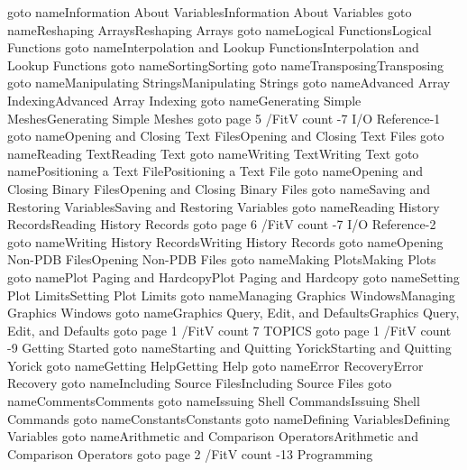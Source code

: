     \pdfoutline goto name{Information About Variables}{Information About Variables}
    \pdfoutline goto name{Reshaping Arrays}{Reshaping Arrays}
    \pdfoutline goto name{Logical Functions}{Logical Functions}
    \pdfoutline goto name{Interpolation and Lookup Functions}{Interpolation and Lookup Functions}
    \pdfoutline goto name{Sorting}{Sorting}
    \pdfoutline goto name{Transposing}{Transposing}
    \pdfoutline goto name{Manipulating Strings}{Manipulating Strings}
    \pdfoutline goto name{Advanced Array Indexing}{Advanced Array Indexing}
    \pdfoutline goto name{Generating Simple Meshes}{Generating Simple Meshes}
  \pdfoutline goto page 5 {/FitV} count -7 {I/O Reference-1}
    \pdfoutline goto name{Opening and Closing Text Files}{Opening and Closing Text Files}
    \pdfoutline goto name{Reading Text}{Reading Text}
    \pdfoutline goto name{Writing Text}{Writing Text}
    \pdfoutline goto name{Positioning a Text File}{Positioning a Text File}
    \pdfoutline goto name{Opening and Closing Binary Files}{Opening and Closing Binary Files}
    \pdfoutline goto name{Saving and Restoring Variables}{Saving and Restoring Variables}
    \pdfoutline goto name{Reading History Records}{Reading History Records}
  \pdfoutline goto page 6 {/FitV} count -7 {I/O Reference-2}
    \pdfoutline goto name{Writing History Records}{Writing History Records}
    \pdfoutline goto name{Opening Non-PDB Files}{Opening Non-PDB Files}
    \pdfoutline goto name{Making Plots}{Making Plots}
    \pdfoutline goto name{Plot Paging and Hardcopy}{Plot Paging and Hardcopy}
    \pdfoutline goto name{Setting Plot Limits}{Setting Plot Limits}
    \pdfoutline goto name{Managing Graphics Windows}{Managing Graphics Windows}
    \pdfoutline goto name{Graphics Query, Edit, and Defaults}{Graphics Query, Edit, and Defaults}  
  \pdfoutline goto page 1 {/FitV} count 7 {TOPICS}
    \pdfoutline goto page 1 {/FitV} count -9 {Getting Started}
      \pdfoutline goto name{Starting and Quitting Yorick}{Starting and Quitting Yorick}
      \pdfoutline goto name{Getting Help}{Getting Help}
      \pdfoutline goto name{Error Recovery}{Error Recovery}
      \pdfoutline goto name{Including Source Files}{Including Source Files}
      \pdfoutline goto name{Comments}{Comments}
      \pdfoutline goto name{Issuing Shell Commands}{Issuing Shell Commands}
      \pdfoutline goto name{Constants}{Constants}
      \pdfoutline goto name{Defining Variables}{Defining Variables}
      \pdfoutline goto name{Arithmetic and Comparison Operators}{Arithmetic and Comparison Operators}
    \pdfoutline goto page 2 {/FitV} count -13 {Programming}
